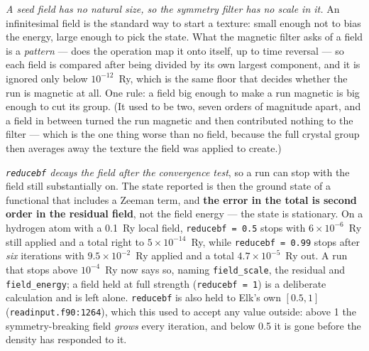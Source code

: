 \documentclass[11pt,a4paper]{article}
\newcommand{\code}[1]{\texttt{\small #1}}
\begin{document}
\emph{A seed field has no natural size, so the symmetry filter has no scale in
it.} An infinitesimal field is the standard way to start a texture: small enough
not to bias the energy, large enough to pick the state. What the magnetic filter
asks of a field is a \emph{pattern} --- does the operation map it onto itself,
up to time reversal --- so each field is compared after being divided by its own
largest component, and it is ignored only below $10^{-12}$~Ry, which is the same
floor that decides whether the run is magnetic at all. One rule: a field big
enough to make a run magnetic is big enough to cut its group. (It used to be two,
seven orders of magnitude apart, and a field in between turned the run magnetic
and then contributed nothing to the filter --- which is the one thing worse than
no field, because the full crystal group then averages away the texture the field
was applied to create.)

\emph{\code{reducebf} decays the field after the convergence test}, so a run can
stop with the field still substantially on. The state reported is then the ground
state of a functional that includes a Zeeman term, and \textbf{the error in the
total is second order in the residual field}, not the field energy --- the state
is stationary. On a hydrogen atom with a 0.1~Ry local field, \code{reducebf =
0.5} stops with $6\times10^{-6}$~Ry still applied and a total right to
$5\times10^{-14}$~Ry, while \code{reducebf = 0.99} stops after \emph{six}
iterations with $9.5\times10^{-2}$~Ry applied and a total $4.7\times10^{-5}$~Ry
out. A run that stops above $10^{-4}$~Ry now says so, naming
\code{field\_scale}, the residual and \code{field\_energy}; a field held at full
strength (\code{reducebf = 1}) is a deliberate calculation and is left alone.
\code{reducebf} is also held to Elk's own $[0.5, 1]$
(\code{readinput.f90:1264}), which this used to accept any value outside:
above 1 the symmetry-breaking field \emph{grows} every iteration, and below 0.5
it is gone before the density has responded to it.
\end{document}
